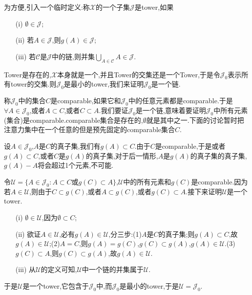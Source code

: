\documentclass[12pt,a4paper,openany]{book}
\begin{document}
为方便,引入一个临时定义:称$\mathscr{X}$的一个子集$\mathscr{J}$是tower,如果
\begin{enumerate}
\item[(i)]$\emptyset \in \mathscr{J}$;
\item[(ii)]若$A \in \mathscr{J}$,则$g(A) \in \mathscr{J}$;
\item[(iii)]若$\mathscr{C}$是$\mathscr{J}$中的链,则并集$\bigcup_{A \in \mathscr{C}}{A} \in \mathscr{J}$.
\end{enumerate}
Tower是存在的,$\mathscr{X}$本身就是一个,并且Tower的交集还是一个Tower,于是令$\mathscr{J}_0$表示所有tower的交集.则$\mathscr{J}_0$是最小的tower,我们来证明$\mathscr{J}_0$是一个链.

称$\mathscr{J}_0$中的集合$C$是comparable,如果它和$\mathscr{J}_0$中的任意元素都是comparable.于是$\forall A \in \mathscr{J}_0$,或者$A \subset C$,或者$C \subset A$.我们要证$\mathscr{J}_0$是一个链,意味着要证明$\mathscr{J}_0$中所有元素(集合)是comparable.comparable集合是存在的,$\emptyset$就是其中之一.下面的讨论暂时把注意力集中在一个任意的但是预先固定的comparable集合$C$.

设$A \in \mathscr{J}_0$,$A$是$C$的真子集,我们有$g(A) \subset C$.由于$C$是comparable,于是或者$g(A) \subset C$,或者$C$是$g(A)$的真子集,对于后一情形,$A$是$g(A)$的真子集的真子集,$g(A)-A$将会超过1个元素,不可能.

令$\mathscr{U}=\{A \in \mathscr{J}_0: A \subset C\text{或}g(C) \subset A\}$,$\mathscr{U}$中的所有元素和$g(C)$是comparable.因为若$A \in \mathscr{U}$,则由于$C \subset g(C)$,或者$A \subset g(C)$,或者$g(C) \subset A$.接下来证明$\mathscr{U}$是一个tower.
\begin{enumerate}
\item[(i)]$\emptyset \in \mathscr{U}$,因为$\emptyset \subset C$;

\item[(ii)]欲证$A \in \mathscr{U}$,必有$g(A) \in \mathscr{U}$,分三步:(1)$A$是$C$的真子集;则$g(A) \subset C$,故$g(A) \in \mathscr{U}$;(2)$A=C$,则$g(A)=g(C)$,$g(C) \subset g(A)$,$g(A) \in \mathscr{U}$.(3)$g(C) \subset A$,则$g(C) \subset g(A)$,故$g(A) \in \mathscr{U}$.

\item[(iii)]从$\mathscr{U}$的定义可知,$\mathscr{U}$中一个链的并集属于$\mathscr{U}$.

\end{enumerate}

于是$\mathscr{U}$是一个tower,它包含于$\mathscr{J}_0$中,而$\mathscr{J}_0$是最小的tower,于是$\mathscr{U}=\mathscr{J}_0$.
\end{document}

